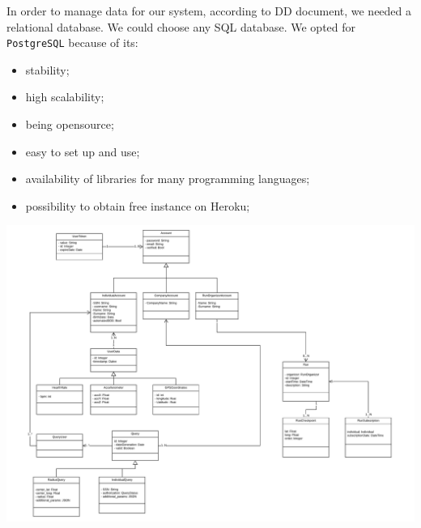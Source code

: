 In order to manage data for our system, according to  DD document, we needed a relational database.
We could choose any SQL database. 
We opted for \texttt{PostgreSQL} because of its:
\begin{itemize}
    \item stability;
    \item high scalability;
    \item being opensource;
    \item easy to set up and use;
    \item availability of libraries for many programming languages;
    \item possibility to obtain free instance on Heroku;
\end{itemize}

\includegraphics[width=\columnwidth]{assets/UML_Entities.pdf}